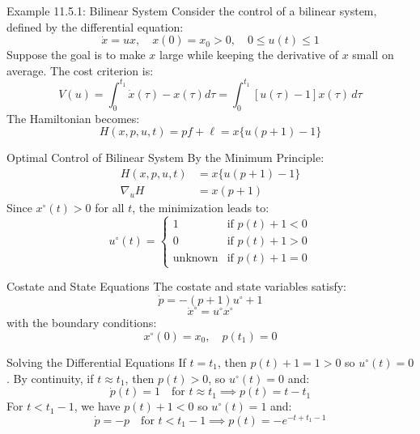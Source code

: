 \documentclass[10pt]{beamer}
\begin{document}
\begin{frame}[fragile]{Example 11.5.1: Bilinear System}
  Consider the control of a bilinear system, defined by the differential equation:
  \[
  \dot{x} = ux, \quad x(0) = x_0 > 0, \quad 0 \le u(t) \le 1
  \]
  Suppose the goal is to make \( x \) large while keeping the derivative of \( x \) small on average. The cost criterion is:
  \[
    V(u) = \int_0^{t_1}\dot{x}(\tau)-x(\tau)d\tau = \int_0^{t_1} [u(\tau) - 1]x(\tau) \, d\tau
  \]
  The Hamiltonian becomes:
  \[
    H(x, p, u, t) = pf+\ell = x \{ u(p + 1) - 1 \}
  \]
\end{frame}
  
\begin{frame}[fragile]{Optimal Control of Bilinear System}
  By the Minimum Principle:
  \[
    \begin{aligned}
      H(x, p, u, t) &= x \{ u(p + 1) - 1 \} \\
      \nabla_u H &= x(p + 1)
    \end{aligned}
  \]
  Since \( x^{\circ}(t) > 0 \) for all $t$, the minimization leads to:
  \[
  u^\circ(t) = \begin{cases}
  1 & \text{if } p(t) + 1 < 0 \\
  0 & \text{if } p(t) + 1 > 0 \\
  \text{unknown} & \text{if } p(t)+1 = 0
  \end{cases}
  \]
\end{frame}
  
\begin{frame}[fragile]{Costate and State Equations}
  The costate and state variables satisfy:
  \[
  \dot{p} = -(p + 1)u^\circ + 1
  \]
  \[
  \dot{x}^\circ = u^\circ x^\circ
  \]
  with the boundary conditions:
  \[
  x^\circ(0) = x_0, \quad p(t_1) = 0
  \]
\end{frame}
  
\begin{frame}[fragile]{Solving the Differential Equations}
  If \( t = t_1 \), then \( p(t) + 1 = 1 > 0 \) so \( u^\circ(t) = 0 \). By continuity, if \( t \approx t_1 \), then \( p(t) > 0 \), so \( u^\circ(t) = 0 \) and:
  \[
  \dot{p}(t) = 1 \quad \text{for } t \approx t_1 \implies p(t) = t - t_1
  \]
  For \( t < t_1 - 1 \), we have \( p(t) + 1 < 0 \) so \( u^\circ(t) = 1 \) and:
  \[
  \dot{p} = -p \quad \text{for } t < t_1 - 1 \implies p(t) = -e^{-t + t_1 - 1}
  \]
\end{frame}
  
\end{document}
